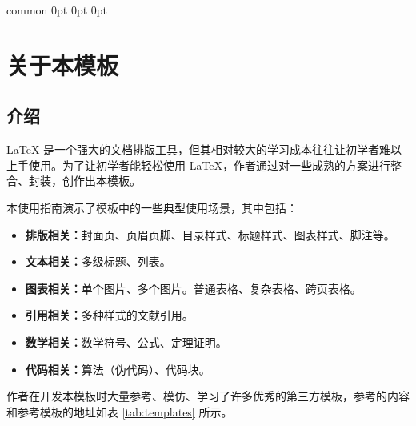 \documentclass[report,oneside,UTF8,zihao=-4]{config}
\begin{document}
\Footer
    {common} %
    {0pt} %
    {0pt} %
    {0pt} %
    {} %
    {\thepage} %
    {} %


\SetArabicPageNumber %


\chapter{关于本模板}

\section{介绍}

\LaTeX{} 是一个强大的文档排版工具，但其相对较大的学习成本往往让初学者难以上手使用。为了让初学者能轻松使用 \LaTeX{}，作者通过对一些成熟的方案进行整合、封装，创作出本模板。

本使用指南演示了模板中的一些典型使用场景，其中包括：

\begin{itemize}
    \item \textbf{排版相关：}封面页、页眉页脚、目录样式、标题样式、图表样式、脚注等。
    \item \textbf{文本相关：}多级标题、列表。
    \item \textbf{图表相关：}单个图片、多个图片。普通表格、复杂表格、跨页表格。
    \item \textbf{引用相关：}多种样式的文献引用。
    \item \textbf{数学相关：}数学符号、公式、定理证明。
    \item \textbf{代码相关：}算法（伪代码）、代码块。
\end{itemize}

作者在开发本模板时大量参考、模仿、学习了许多优秀的第三方模板，参考的内容和参考模板的地址如表 \ref{tab:templates} 所示。
\end{document}
